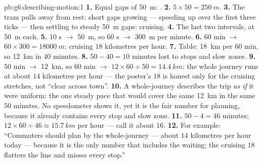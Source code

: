 \begin{solution}{pb:g6:describing-motion:1}
\textbf{1.} Equal gaps of \qty{50}{m}: .
\textbf{2.} $5 \times 50 = \qty{250}{m}$.
\textbf{3.} The tram pulls away from rest: short gaps growing ---
speeding up over the first three ticks --- then settling to
steady \qty{50}{m} gaps: cruising.
\textbf{4.} The last two intervals, at \qty{50}{m} each.
\textbf{5.} $10$ s $\to$ \qty{50}{m}, so $60$ s $\to$
\qty{300}{m} per minute.
\textbf{6.} $60$ min $\to$ $60 \times 300 = \qty{18000}{m}$:
cruising  $18$ kilometres per hour.
\textbf{7.} Table: \qty{18}{km} per $60$ min, so \qty{12}{km} in
$40$ minutes.
\textbf{8.} $50 - 40 = 10$ minutes lost to stops and slow zones.
\textbf{9.} $50$ min $\to$ \qty{12}{km}, so $60$ min $\to$
$12 \times 60 \div 50 = \qty{14.4}{km}$: the whole journey runs at
about $14$ kilometres per hour --- the poster's $18$ is honest
only for the cruising stretches, not ``clear across town''.
\textbf{10.} A whole-journey  describes the trip \emph{as if}
it were uniform: the one steady pace that would cover the same
\qty{12}{km} in the same $50$ minutes. No speedometer shows it,
yet it is the fair number for planning, because it already
contains every stop and slow zone.
\textbf{11.} $50 - 4 = 46$ minutes; $12 \times 60 \div 46 \approx
\qty{15.7}{km}$ per hour --- call it about $16$.
\textbf{12.} For example: ``Commuters should plan by the
whole-journey  --- about $14$ kilometres per hour today ---
because it is the only number that includes the waiting; the
cruising $18$ flatters the line and misses every stop.''
\end{solution}
